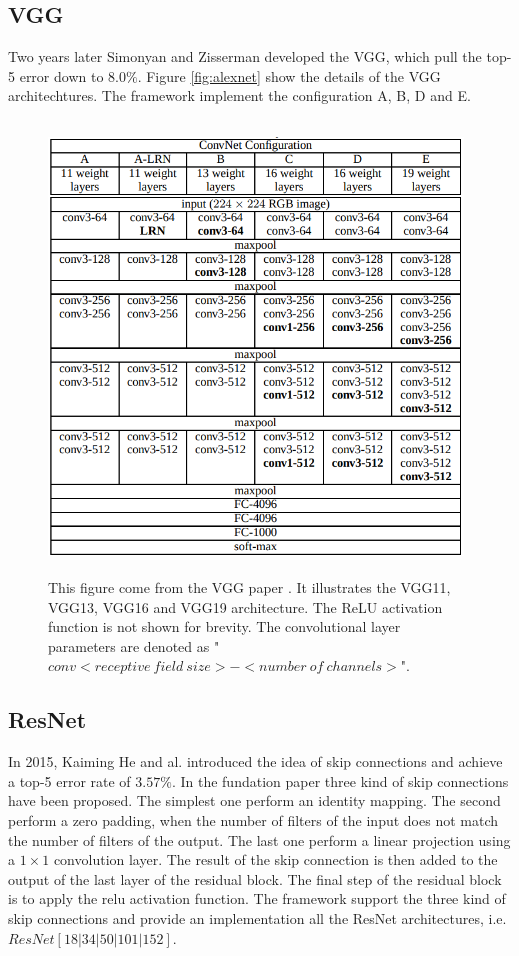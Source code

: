 \documentclass[11pt]{report}
\begin{document}
\newpage
\subsection{VGG}

Two years later Simonyan and Zisserman developed the VGG, which pull the top-5 error down to $8.0\%$. Figure \ref{fig:alexnet} show the details of the VGG architechtures. The framework implement the configuration A, B, D and E.

\begin{figure}[h]\label{fig:vgg}
\centering
\includegraphics[width=11cm, height=12cm]{vgg}
\caption[VGG architecture]{This figure come from the VGG paper \cite{DBLP:journals/corr/RussakovskyDSKSMHKKBBF14}. It illustrates the VGG11, VGG13, VGG16 and VGG19 architecture. The ReLU activation function is not shown for brevity. The convolutional layer parameters are denoted as "$conv<receptive\ field\ size>-<number\ of\ channels>$".}
\end{figure}

\newpage
\subsection{ResNet}

In 2015, Kaiming He and al. introduced the idea of skip connections and achieve a top-5 error rate of $3.57\%$. In the fundation paper three kind of skip connections have been proposed. The simplest one perform an identity mapping. The second perform a zero padding, when the number of filters of the input does not match the number of filters of the output. The last one perform a linear projection using a $1\times1$ convolution layer. The result of the skip connection is then added to the output of the last layer of the residual block. The final step of the residual block is to apply the relu activation function. The framework support the three kind of skip connections and provide an implementation all the ResNet architectures, i.e. $ResNet[18|34|50|101|152]$.
\end{document}
